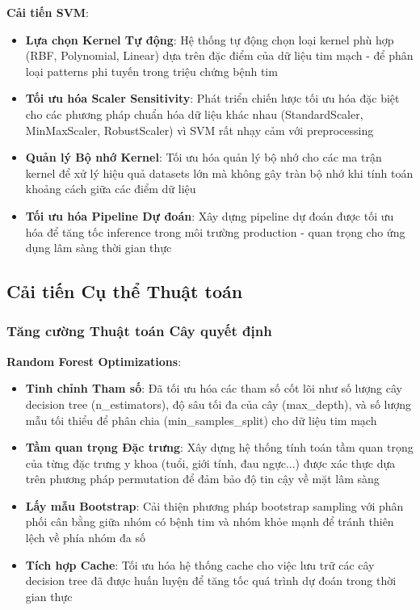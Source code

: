 \textbf{Cải tiến SVM}:
\begin{itemize}
    \item \textbf{Lựa chọn Kernel Tự động}: Hệ thống tự động chọn loại kernel phù hợp (RBF, Polynomial, Linear) dựa trên đặc điểm của dữ liệu tim mạch - để phân loại patterns phi tuyến trong triệu chứng bệnh tim
    \item \textbf{Tối ưu hóa Scaler Sensitivity}: Phát triển chiến lược tối ưu hóa đặc biệt cho các phương pháp chuẩn hóa dữ liệu khác nhau (StandardScaler, MinMaxScaler, RobustScaler) vì SVM rất nhạy cảm với preprocessing
    \item \textbf{Quản lý Bộ nhớ Kernel}: Tối ưu hóa quản lý bộ nhớ cho các ma trận kernel để xử lý hiệu quả datasets lớn mà không gây tràn bộ nhớ khi tính toán khoảng cách giữa các điểm dữ liệu
    \item \textbf{Tối ưu hóa Pipeline Dự đoán}: Xây dựng pipeline dự đoán được tối ưu hóa để tăng tốc inference trong môi trường production - quan trọng cho ứng dụng lâm sàng thời gian thực
\end{itemize}

\subsection{Cải tiến Cụ thể Thuật toán}\label{subsec:algorithm-specific}

\subsubsection{Tăng cường Thuật toán Cây quyết định}

\textbf{Random Forest Optimizations}:
\begin{itemize}
    \item \textbf{Tinh chỉnh Tham số}: Đã tối ưu hóa các tham số cốt lõi như số lượng cây decision tree (n\_estimators), độ sâu tối đa của cây (max\_depth), và số lượng mẫu tối thiểu để phân chia (min\_samples\_split) cho dữ liệu tim mạch
    \item \textbf{Tầm quan trọng Đặc trưng}: Xây dựng hệ thống tính toán tầm quan trọng của từng đặc trưng y khoa (tuổi, giới tính, đau ngực...) được xác thực dựa trên phương pháp permutation để đảm bảo độ tin cậy về mặt lâm sàng
    \item \textbf{Lấy mẫu Bootstrap}: Cải thiện phương pháp bootstrap sampling với phân phối cân bằng giữa nhóm có bệnh tim và nhóm khỏe mạnh để tránh thiên lệch về phía nhóm đa số
    \item \textbf{Tích hợp Cache}: Tối ưu hóa hệ thống cache cho việc lưu trữ các cây decision tree đã được huấn luyện để tăng tốc quá trình dự đoán trong thời gian thực
\end{itemize}

